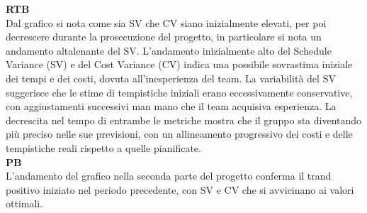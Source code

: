 \textbf{RTB} \\
Dal grafico si nota come sia SV che CV siano inizialmente elevati, per poi decrescere durante la prosecuzione del progetto, in particolare si nota un andamento altalenante del SV. L'andamento inizialmente alto del Schedule Variance (SV) e del Cost Variance (CV) indica una possibile sovrastima iniziale dei tempi e dei costi, dovuta all'inesperienza del team. La variabilità del SV suggerisce che le stime di tempistiche iniziali erano eccessivamente conservative, con aggiustamenti successivi man mano che il team acquisiva esperienza. La decrescita nel tempo di entrambe le metriche mostra che il gruppo sta diventando più preciso nelle sue previsioni, con un allineamento progressivo dei costi e delle tempistiche reali rispetto a quelle pianificate. \\

\textbf{PB} \\
L'andamento del grafico nella seconda parte del progetto conferma il trand positivo iniziato nel periodo precedente, con SV e CV che si avvicinano ai valori ottimali.

\newpage
